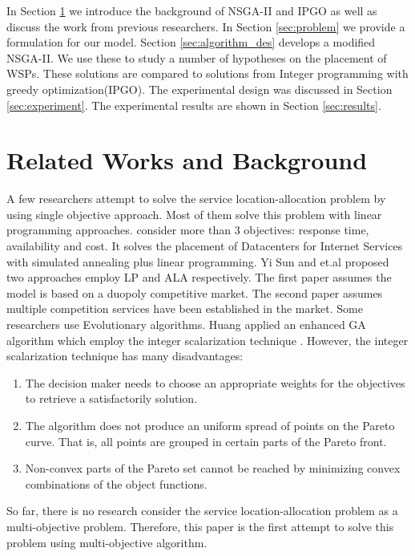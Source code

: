 \documentclass{llncs}
\begin{document}
In Section \ref{sec:Background} we introduce the background of NSGA-II and IPGO as well as discuss the work from previous researchers.
In Section \ref{sec:problem} we provide a formulation for our model. Section \ref{sec:algorithm_des} develops a modified NSGA-II. 
We use these to study a number of hypotheses on the placement of WSPs. These solutions are compared to solutions from Integer
programming with greedy optimization(IPGO). 
The experimental design was discussed in Section \ref{sec:experiment}. The experimental results are shown in Section \ref{sec:results}.


\section{Related Works and Background}
\label{sec:Background}
A few researchers attempt to solve the service location-allocation problem by using single objective approach. Most of them solve this problem with linear programming approaches.
\cite{5961695} consider more than 3 objectives: response time, availability and cost. It solves the placement of Datacenters for Internet Services with simulated annealing plus linear programming. Yi Sun and et.al proposed two approaches \cite{Aboolian} \cite{Sun} employ LP and ALA respectively. The first paper assumes the model is based on a duopoly competitive market.
The second paper assumes multiple competition services have been established in the market.
Some researchers use Evolutionary algorithms. Huang \cite{EnhancedGenetic} applied an enhanced GA algorithm which employ the integer scalarization technique \cite{Multiobjective}. However, 
the integer scalarization technique has many disadvantages:
\begin{enumerate}
	\item The decision maker needs to choose an appropriate weights for the objectives to retrieve a satisfactorily solution.
	\item The algorithm does not produce an uniform spread of points on the Pareto curve. That is, all points are grouped in certain parts of the Pareto front.
	\item Non-convex parts of the Pareto set cannot be reached by minimizing convex combinations of the object functions.
\end{enumerate}

So far, there is no research consider the service location-allocation problem as a multi-objective problem. Therefore, this paper is the first attempt to solve this problem using 
multi-objective algorithm.
\end{document}

